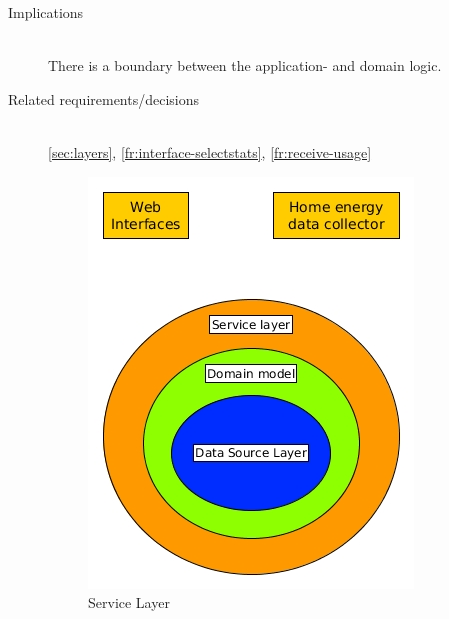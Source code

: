 \begin{description}
\item [Implications]~\\
There is a boundary between the application- and domain logic.

\item [Related requirements/decisions]~\\
\ref{sec:layers}, \ref{fr:interface-selectstats}, \ref{fr:receive-usage}

\begin{figure}[H]
\caption{Service Layer}
\centering
\includegraphics[scale=0.7]{4-analysis/images/ServiceLayer.jpg}
\end{figure}


\end{description}


